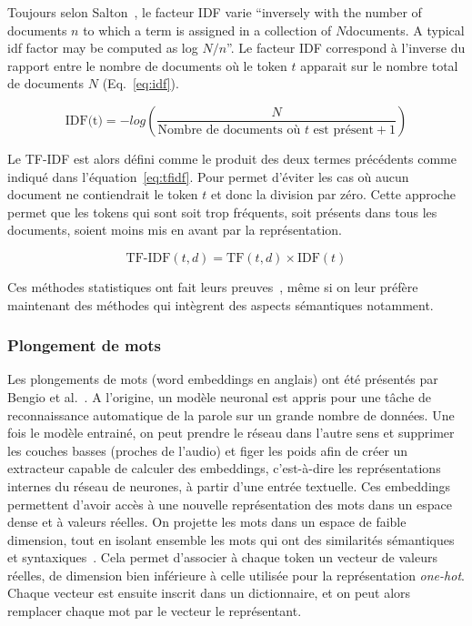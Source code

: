 Toujours selon Salton~\cite{salton_tf_idf}, le facteur IDF varie ``inversely with the number of documents $n$ to which a term is assigned in a collection of $N $documents. A typical idf factor may be computed as log $N/n$''.
Le facteur IDF correspond à l'inverse du rapport entre le nombre de documents où le token $t$ apparait sur le nombre total de documents $N$ (Eq.~\ref{eq:idf}).

\begin{equation}
    \text{IDF(t)} = - log\left(\dfrac{N}{\text{Nombre de documents où } t \text{ est présent} + 1} \right)
\label{eq:idf}
\end{equation}

Le TF-IDF est alors défini comme le produit des deux termes précédents comme indiqué dans l'équation~\ref{eq:tfidf}.
Pour permet d'éviter les cas où aucun document ne contiendrait le token $t$ et donc la division par zéro. Cette approche permet que les tokens qui sont soit trop fréquents, soit présents dans tous les documents, soient moins mis en avant par la représentation.

\begin{equation}
    \text{TF-IDF}(t,d) = \text{TF}(t,d) \times \text{IDF}(t)
\label{eq:tfidf}
\end{equation}

Ces méthodes statistiques ont fait leurs preuves~\cite{Martineau2009,Cambria2013,Pimpalkar2020}, même si on leur préfère maintenant des méthodes qui intègrent des aspects sémantiques notamment.

\subsubsection{Plongement de mots}


Les plongements de mots (word embeddings en anglais) ont été présentés par Bengio et al.~\cite{Bengio2003}.
A l'origine, un modèle neuronal est appris pour une tâche de reconnaissance automatique de la parole sur un grande nombre de données. Une fois le modèle entrainé, on peut prendre le réseau dans l'autre sens et supprimer les couches basses (proches de l'audio) et figer les poids afin de créer un extracteur capable de calculer des embeddings, c'est-à-dire les représentations internes du réseau de neurones, à partir d'une entrée textuelle. Ces embeddings permettent d'avoir accès à une nouvelle représentation des mots dans un espace dense et à valeurs réelles.
On projette les mots dans un espace de faible dimension, tout en isolant ensemble les mots qui ont des similarités sémantiques et syntaxiques~\cite{Ghannay2017}. Cela permet d'associer à chaque token un vecteur de valeurs réelles, de dimension bien inférieure à celle utilisée pour la représentation \textit{one-hot}. Chaque vecteur est ensuite inscrit dans un dictionnaire, et on peut alors remplacer chaque mot par le vecteur le représentant.

